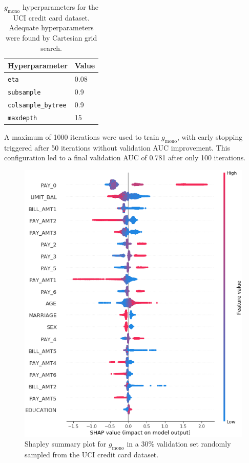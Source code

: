 \documentclass[11pt]{asaproc}
\begin{document}
\begin{table}[ht]
	\centering
	\caption{$g_{\text{mono}}$ hyperparameters for the UCI credit card dataset. Adequate hyperparameters were found by Cartesian grid search.}
	\begin{tabular}{ | p{3.5cm} | p{1.2cm} | }
	\hline
	Hyperparameter & Value \\ 
	\hline
	\texttt{eta} & 0.08 \\
	\hline	
	\texttt{subsample} & 0.9 \\
	\hline	
	\texttt{colsample\_bytree} & 0.9 \\
	\hline
	\texttt{maxdepth} & 15 \\	
	\hline
	\end{tabular}
	\label{tab:mono_gbm}
\end{table}	 

\noindent A maximum of 1000 iterations were used to train $g_{\text{mono}}$, with early stopping triggered after 50 iterations without validation AUC improvement. This configuration led to a final validation AUC of 0.781 after only 100 iterations. 

\begin{figure}[htb]
	\begin{center}
		\includegraphics[scale=0.4]{img/figure_7.eps}
		\caption{Shapley summary plot for $g_{\text{mono}}$ in a 30\% validation set randomly sampled from the UCI credit card dataset.}
		\label{fig:cc_global_shapley}
	\end{center}
\end{figure}
\end{document}
